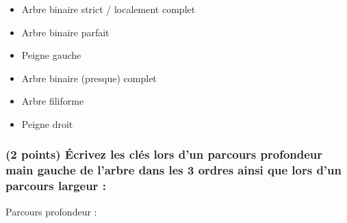 \documentclass[11pt,a4paper]{article}
\begin{document}
\medskip

\begin{table}[ht!]
  \centering
  \begin{minipage}{0.50\textwidth}
    \centering

\begin{itemize}
  \item[\CaseCoche] Arbre binaire strict / localement complet \phantom{()}
  \item[\CaseCoche] Arbre binaire parfait \phantom{()}
  \item[\CaseCoche] Peigne gauche \phantom{()}
\end{itemize}

  \end{minipage}
  \hfillx
  \begin{minipage}{0.50\textwidth}
    \centering

\begin{itemize}
  \item[\CaseCoche] Arbre binaire (presque) complet \phantom{()}
  \item[\CaseCoche] Arbre filiforme \phantom{()}
  \item[\CaseCoche] Peigne droit \phantom{()}
\end{itemize}

  \end{minipage}
\end{table}



\subsubsection{(2 points) \'Ecrivez les clés lors d'un parcours profondeur main gauche de l'arbre dans les 3 ordres ainsi que lors d'un parcours largeur : }


Parcours profondeur :

\medskip
\end{document}
